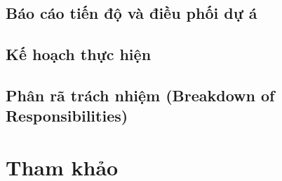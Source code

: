 \documentclass[a4paper, 12pt]{article}
\begin{document}
	\subsection{Báo cáo tiến độ và điều phối dự á}
	
	\subsection{Kế hoạch thực hiện}
	
	\subsection{Phân rã trách nhiệm (Breakdown of Responsibilities)}
	
	\clearpage
	
	\section{Tham khảo}
	\clearpage
	
\end{document}
